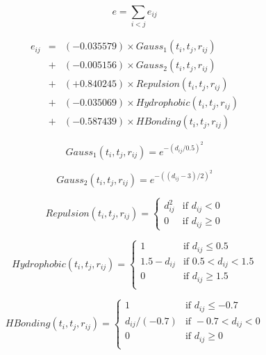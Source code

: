 \begin{equation}
\label{istar:e}
e = \sum_{i < j} e_{ij}
\end{equation}

\begin{eqnarray}
\label{istar:e_ij}
e_{ij} &=& (-0.035579) \times Gauss_1(t_i, t_j, r_{ij}) \nonumber \\
       &+& (-0.005156) \times Gauss_2(t_i, t_j, r_{ij}) \nonumber \\
       &+& (+0.840245) \times Repulsion(t_i, t_j, r_{ij}) \nonumber \\
       &+& (-0.035069) \times Hydrophobic(t_i, t_j, r_{ij}) \nonumber \\
       &+& (-0.587439) \times HBonding(t_i, t_j, r_{ij})
\end{eqnarray}

\begin{equation}
\label{istar:Gauss1}
Gauss_1(t_i, t_j, r_{ij}) = e^{-(d_{ij} / 0.5)^2}
\end{equation}

\begin{equation}
\label{istar:Gauss2}
Gauss_2(t_i, t_j, r_{ij}) = e^{-((d_{ij} - 3) / 2)^2}
\end{equation}

\begin{equation}
\label{istar:Repulsion}
Repulsion(t_i, t_j, r_{ij}) =
\begin{cases}
d_{ij}^2 & \text{if } d_{ij} < 0\\
0 &\text{if } d_{ij} \geq 0
\end{cases}
\end{equation}

\begin{equation}
\label{istar:Hydrophobic}
Hydrophobic(t_i, t_j, r_{ij}) =
\begin{cases}
1 & \text{if } d_{ij} \leq 0.5\\
1.5 - d_{ij} & \text{if } 0.5 < d_{ij} < 1.5\\
0 & \text{if } d_{ij} \geq 1.5\\
\end{cases}
\end{equation}

\begin{equation}
\label{istar:HBonding}
HBonding(t_i, t_j, r_{ij}) =
\begin{cases}
1 & \text{if } d_{ij} \leq -0.7\\
d_{ij} / (-0.7) & \text{if } -0.7 < d_{ij} < 0\\
0 & \text{if } d_{ij} \geq 0\\
\end{cases}
\end{equation}

